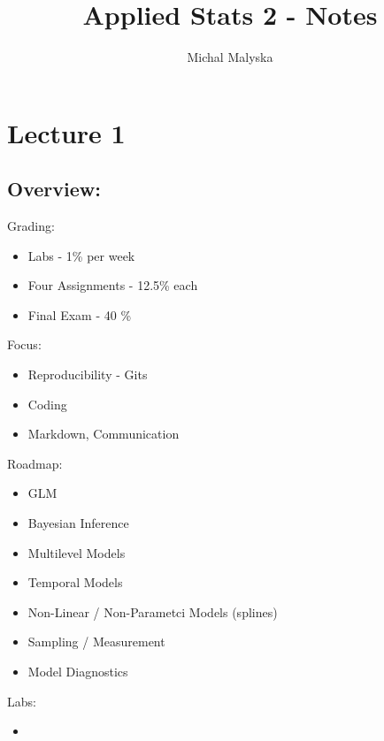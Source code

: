 \documentclass{article}
\title{Applied Stats 2 - Notes}
\author{Michal Malyska}
\begin{document}
\maketitle

\newpage

\tableofcontents

\newpage

\section{Lecture 1}

\subsection{Overview:}

Grading:

\begin{itemize}
  \item Labs - 1\% per week
  \item Four Assignments - 12.5\% each
  \item Final Exam - 40 \%
\end{itemize}

Focus:

\begin{itemize}
  \item Reproducibility - Gits
  \item Coding
  \item Markdown, Communication
\end{itemize}

Roadmap:

\begin{itemize}
  \item GLM
  \item Bayesian Inference
  \item Multilevel Models
  \item Temporal Models
  \item Non-Linear / Non-Parametci Models (splines)
  \item Sampling / Measurement
  \item Model Diagnostics
\end{itemize}

Labs:

\begin{itemize}
  \item
\end{itemize}
\end{document}

